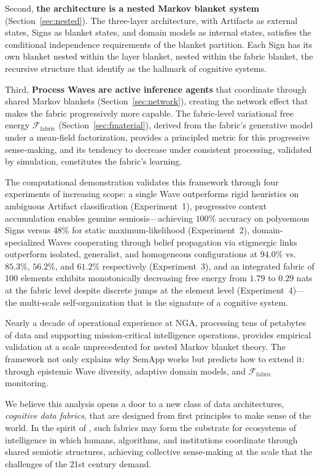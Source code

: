 \documentclass[11pt,a4paper]{article}
\theoremstyle{definition}
\begin{document}
Second, \textbf{the architecture is a nested Markov blanket system} (Section~\ref{sec:nested}). The three-layer architecture, with Artifacts as external states, Signs as blanket states, and domain models as internal states, satisfies the conditional independence requirements of the blanket partition. Each Sign has its own blanket nested within the layer blanket, nested within the fabric blanket, the recursive structure that \citet{kirchhoff2018markov} identify as the hallmark of cognitive systems.

Third, \textbf{Process Waves are active inference agents} that coordinate through shared Markov blankets (Section~\ref{sec:network}), creating the network effect that makes the fabric progressively more capable. The fabric-level variational free energy $\mathcal{F}_{\text{fabric}}$ (Section~\ref{sec:fmaterial}), derived from the fabric's generative model under a mean-field factorization, provides a principled metric for this progressive sense-making, and its tendency to decrease under consistent processing, validated by simulation, constitutes the fabric's learning.

The computational demonstration validates this framework through four experiments of increasing scope: a single Wave outperforms rigid heuristics on ambiguous Artifact classification (Experiment~1), progressive context accumulation enables genuine semiosis---achieving $100\%$ accuracy on polysemous Signs versus $48\%$ for static maximum-likelihood (Experiment~2), domain-specialized Waves cooperating through belief propagation via stigmergic links outperform isolated, generalist, and homogeneous configurations at $94.0\%$ vs.\ $85.3\%$, $56.2\%$, and $61.2\%$ respectively (Experiment~3), and an integrated fabric of 100 elements exhibits monotonically decreasing free energy from $1.79$ to $0.29$ nats at the fabric level despite discrete jumps at the element level (Experiment~4)---the multi-scale self-organization that is the signature of a cognitive system.

Nearly a decade of operational experience at NGA, processing tens of petabytes of data and supporting mission-critical intelligence operations, provides empirical validation at a scale unprecedented for nested Markov blanket theory. The framework not only explains why SemApp works but predicts how to extend it: through epistemic Wave diversity, adaptive domain models, and $\mathcal{F}_{\text{fabric}}$ monitoring.

We believe this analysis opens a door to a new class of data architectures, \emph{cognitive data fabrics}, that are designed from first principles to make sense of the world. In the spirit of \citet{friston2022ecosystems}, such fabrics may form the substrate for ecosystems of intelligence in which humans, algorithms, and institutions coordinate through shared semiotic structures, achieving collective sense-making at the scale that the challenges of the 21st century demand.
\end{document}
